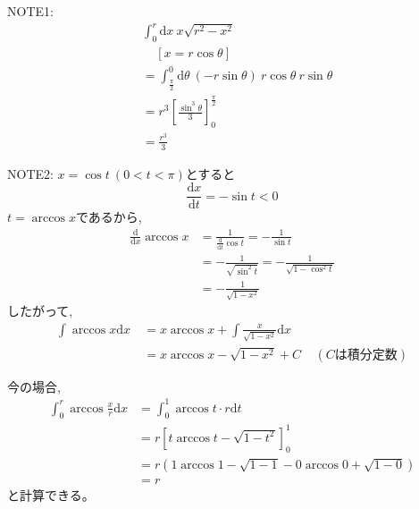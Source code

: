 NOTE1:
\begin{align}
&\int_{0}^{r}\mathrm{d}x\ x\sqrt{r^{2}-x^{2}} \nonumber \\
&\ \ \ \ \ \left[x = r\cos \theta \right]\nonumber \\
&= \int_{\frac{\pi}{2}}^{0}\mathrm{d}\theta\ (-r\sin\theta)\ r\cos\theta\ r\sin\theta\nonumber \\
&= r^{3}\left[ \frac{\sin^{3}\theta}{3}\right]^{\frac{\pi}{2}}_{0} \nonumber \\
&= \frac{r^{3}}{3}
\end{align}

NOTE2:
$x = \cos t \ (0< t< \pi)$とすると
\[\frac{\mathrm{d}x}{\mathrm{d}t} = - \sin t < 0\]
$t = \arccos x$であるから,
\begin{align}
\frac{\mathrm{d}}{\mathrm{d}x}\arccos x &= \frac{1}{\frac{\mathrm{d}}{\mathrm{d}t}\cos t} = -\frac{1}{\sin t}\nonumber \\
&=- \frac{1}{\sqrt{\sin^{2}t}} = - \frac{1}{\sqrt{1- \cos^{2}t}} \nonumber \\
&= - \frac{1}{\sqrt{1- x^{2}}}
\end{align}
したがって,
\begin{align}
\int \arccos x \mathrm{d}x\  &= x\arccos x + \int \frac{x}{\sqrt{1-x^{2}}}\mathrm{d}x\nonumber \\
&=x\arccos x - \sqrt{1-x^{2}} + C\ \ \ \ \ (C\text{は積分定数})
\end{align}

今の場合,
\begin{align}
\int^{r}_{0} \arccos \frac{x}{r} \mathrm{d}x &= \int^{1}_{0}\arccos t \cdot r\mathrm{d}t\nonumber \\
&= r \left[ t \arccos t - \sqrt{1-t^{2}} \right]^{1}_{0}\nonumber \\
&= r ( 1\arccos1 -\sqrt{1-1} - 0 \arccos0 + \sqrt{1-0})\nonumber \\
&= r
\end{align}
と計算できる。

